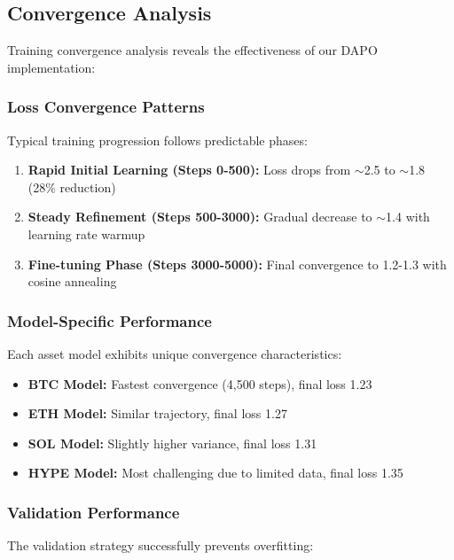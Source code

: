 \documentclass{report}
\begin{document}
\subsection{Convergence Analysis}

Training convergence analysis reveals the effectiveness of our DAPO implementation:

\subsubsection{Loss Convergence Patterns}

Typical training progression follows predictable phases:

\begin{enumerate}
    \item \textbf{Rapid Initial Learning (Steps 0-500):} Loss drops from $\sim$2.5 to $\sim$1.8 (28\% reduction)
    \item \textbf{Steady Refinement (Steps 500-3000):} Gradual decrease to $\sim$1.4 with learning rate warmup
    \item \textbf{Fine-tuning Phase (Steps 3000-5000):} Final convergence to 1.2-1.3 with cosine annealing
\end{enumerate}

\subsubsection{Model-Specific Performance}

Each asset model exhibits unique convergence characteristics:

\begin{itemize}
    \item \textbf{BTC Model:} Fastest convergence (4,500 steps), final loss 1.23
    \item \textbf{ETH Model:} Similar trajectory, final loss 1.27
    \item \textbf{SOL Model:} Slightly higher variance, final loss 1.31
    \item \textbf{HYPE Model:} Most challenging due to limited data, final loss 1.35
\end{itemize}

\subsubsection{Validation Performance}

The validation strategy successfully prevents overfitting:
\end{document}
